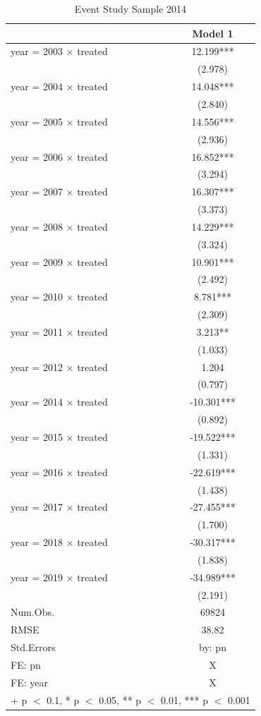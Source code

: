 \documentclass[
  12pt,
]{article}
\begin{document}
\begin{table}

\caption{\label{tab:Tab-3}Event Study Sample 2014}
\centering
\begin{tabular}[t]{lc}
\toprule
  & Model 1\\
\midrule
year = 2003 × treated & 12.199***\\
 & (2.978)\\
year = 2004 × treated & 14.048***\\
 & (2.840)\\
year = 2005 × treated & 14.556***\\
 & (2.936)\\
year = 2006 × treated & 16.852***\\
 & (3.294)\\
year = 2007 × treated & 16.307***\\
 & (3.373)\\
year = 2008 × treated & 14.229***\\
 & (3.324)\\
year = 2009 × treated & 10.901***\\
 & (2.492)\\
year = 2010 × treated & 8.781***\\
 & (2.309)\\
year = 2011 × treated & 3.213**\\
 & (1.033)\\
year = 2012 × treated & 1.204\\
 & (0.797)\\
year = 2014 × treated & -10.301***\\
 & (0.892)\\
year = 2015 × treated & -19.522***\\
 & (1.331)\\
year = 2016 × treated & -22.619***\\
 & (1.438)\\
year = 2017 × treated & -27.455***\\
 & (1.700)\\
year = 2018 × treated & -30.317***\\
 & (1.838)\\
year = 2019 × treated & -34.989***\\
 & (2.191)\\
\midrule
Num.Obs. & 69824\\
RMSE & 38.82\\
Std.Errors & by: pn\\
FE: pn & X\\
FE: year & X\\
\bottomrule
\multicolumn{2}{l}{\rule{0pt}{1em}+ p $<$ 0.1, * p $<$ 0.05, ** p $<$ 0.01, *** p $<$ 0.001}\\
\end{tabular}
\end{table}
\end{document}

